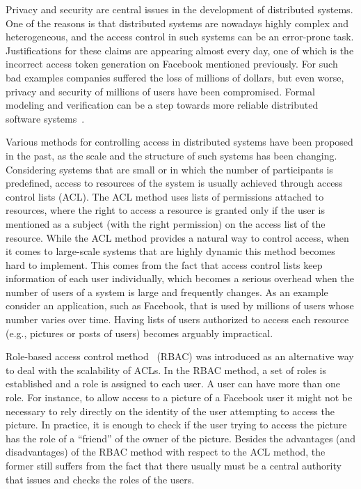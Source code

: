 Privacy and security are central issues in the development of distributed systems. One of the reasons is that distributed systems are nowadays highly complex and heterogeneous, and the access control in such systems can be an error-prone task. Justifications for these claims are appearing almost every day, one of which is the incorrect access token generation on Facebook mentioned previously. For such bad examples companies suffered the loss of millions of dollars, but even worse, privacy and security of millions of users have been compromised. Formal modeling and verification can be a step towards more reliable distributed software systems~\cite{DBLP:journals/jlp/BugliesiCF17}.

%

Various methods for controlling access in distributed systems have been proposed in the past, as the scale and the structure of such systems has been changing.
%
Considering systems that are small or in which the number of participants is predefined, 
access to resources of the system is usually achieved through access control lists (ACL). 
The ACL method uses lists of permissions attached to resources, where the right to access a 
resource is granted only if the user is mentioned as a subject (with the right permission) on 
the access list of the resource.
% 
While the ACL method provides a natural way to control access, when it comes to large-scale systems 
that are highly dynamic this method becomes hard to implement. 
This comes from the fact that access control lists keep information of each user individually, 
which becomes a serious overhead when the number of users of a system is large and frequently changes. 
As an example consider an application, such as Facebook, that is used by millions of users whose number varies over time. 
Having lists of users authorized to access each resource (e.g., pictures or posts of users) becomes arguably impractical. 

Role-based access control method~\cite{sandhu1996role} (RBAC) was introduced as an alternative way 
to deal with the scalability of ACLs. 
In the RBAC method, a set of roles is established and a role is assigned to each user. A user can have more than one role.
For instance, to allow access to a picture of a Facebook user it might not be 
necessary to rely directly on the identity of the user attempting to access the picture. In practice, it is enough to check if the user trying to access 
the picture has the role of a ``friend'' of the owner of the picture. 
%
Besides the advantages (and disadvantages) of the RBAC method with respect to the ACL method, the former still suffers from the fact that there usually must be a central authority that issues and checks the roles of the users.

